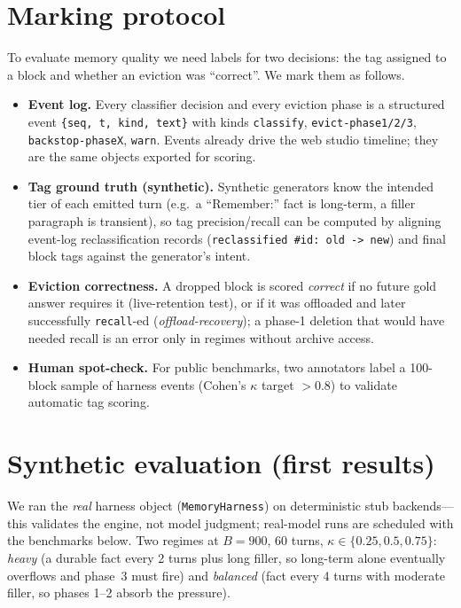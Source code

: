 \documentclass[10pt]{article}
\begin{document}
\section{Marking protocol}
To evaluate memory quality we need labels for two decisions: the tag assigned to a block and whether an eviction was ``correct''. We mark them as follows.
\begin{itemize}
\item \textbf{Event log.} Every classifier decision and every eviction phase is a structured event \verb|{seq, t, kind, text}| with kinds \texttt{classify}, \texttt{evict-phase1/2/3}, \texttt{backstop-phaseX}, \texttt{warn}. Events already drive the web studio timeline; they are the same objects exported for scoring.
\item \textbf{Tag ground truth (synthetic).} Synthetic generators know the intended tier of each emitted turn (e.g.\ a ``Remember:'' fact is long-term, a filler paragraph is transient), so tag precision/recall can be computed by aligning event-log reclassification records (\verb|reclassified #id: old -> new|) and final block tags against the generator's intent.
\item \textbf{Eviction correctness.} A dropped block is scored \emph{correct} if no future gold answer requires it (live-retention test), or if it was offloaded and later successfully \texttt{recall}-ed (\emph{offload-recovery}); a phase-1 deletion that would have needed recall is an error only in regimes without archive access.
\item \textbf{Human spot-check.} For public benchmarks, two annotators label a 100-block sample of harness events (Cohen's $\kappa$ target $>0.8$) to validate automatic tag scoring.
\end{itemize}

\section{Synthetic evaluation (first results)}\label{sec:synthetic}
We ran the \emph{real} harness object (\texttt{MemoryHarness}) on deterministic stub backends---this validates the engine, not model judgment; real-model runs are scheduled with the benchmarks below. Two regimes at $B=900$, 60 turns, $\kappa\in\{0.25,0.5,0.75\}$: \emph{heavy} (a durable fact every 2 turns plus long filler, so long-term alone eventually overflows and phase~3 must fire) and \emph{balanced} (fact every 4 turns with moderate filler, so phases 1--2 absorb the pressure).
\end{document}
